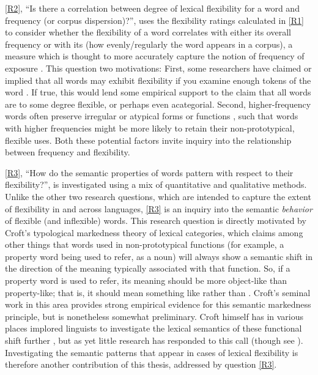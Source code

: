 \ref{R2}, \enquote{Is there a correlation between degree of lexical flexibility for a word and frequency (or corpus dispersion)?}, uses the flexibility ratings calculated in \ref{R1} to consider whether the flexibility of a word correlates with either its overall frequency or with its  (how evenly/regularly the word appears in a corpus), a measure which is thought to more accurately capture the notion of frequency of exposure . This question two motivations: First, some researchers have claimed or implied that all words may exhibit flexibility if you examine enough tokens of the word . If true, this would lend some empirical support to the claim that all words are to some degree flexible, or perhaps even acategorial. Second, higher-frequency words often preserve irregular or atypical forms or functions , such that words with higher frequencies might be more likely to retain their non-prototypical, flexible uses. Both these potential factors invite inquiry into the relationship between frequency and flexibility.

\ref{R3}, \enquote{How do the semantic properties of words pattern with respect to their flexibility?}, is investigated using a mix of quantitative and qualitative methods. Unlike the other two research questions, which are intended to capture the extent of flexibility in and across languages, \ref{R3} is an inquiry into the semantic \emph{behavior} of flexible (and inflexible) words. This research question is directly motivated by Croft's  typological markedness theory of lexical categories, which claims among other things that words used in non-prototypical functions (for example, a property word being used to refer, as a noun) will always show a semantic shift in the direction of the meaning typically associated with that function. So, if a property word is used to refer, its meaning should be more object-like than property-like; that is, it should mean something like  rather than . Croft's  seminal work in this area provides strong empirical evidence for this semantic markedness principle, but is nonetheless somewhat preliminary. Croft himself has in various places implored linguists to investigate the lexical semantics of these functional shift further , but as yet little research has responded to this call (though see ). Investigating the semantic patterns that appear in cases of lexical flexibility is therefore another contribution of this thesis, addressed by question \ref{R3}.

